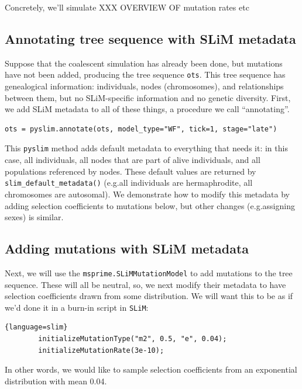 \documentclass[12pt]{article}
\newcommand{\slim}[0]{\texttt{SLiM}\xspace}
\newcommand{\pyslim}[0]{\texttt{pyslim}\xspace}
\newcommand*{\eg}{e.g.\xcomma}
\begin{document}
Concretely, we'll simulate XXX OVERVIEW OF mutation rates etc


\subsection*{Annotating tree sequence with SLiM metadata}

Suppose that the coalescent simulation has already been done,
but mutations have not been added,
producing the tree sequence \verb|ots|.
This tree sequence has genealogical information:
individuals, nodes (chromosomes), and relationships between them,
but no SLiM-specific information and no genetic diversity.
First, we add SLiM metadata to all of these things, a procedure we call ``annotating''.
\begin{listing}[H]
  \begin{verbatim}
ots = pyslim.annotate(ots, model_type="WF", tick=1, stage="late")
  \end{verbatim}
\end{listing}
This \pyslim method adds default metadata to everything that needs it:
in this case, all individuals, all nodes that are part of alive individuals,
and all populations referenced by nodes.
These default values are returned by \verb|slim_default_metadata()|
(\eg all individuals are hermaphrodite, all chromosomes are autosomal).
We demonstrate how to modify this metadata by adding selection coefficients to mutations below,
but other changes (\eg assigning sexes) is similar.


\subsection*{Adding mutations with SLiM metadata}

Next, we will use the \verb|msprime.SLiMMutationModel| to add mutations to the tree sequence.
These will all be neutral,
so, we next modify their metadata to have selection coefficients drawn from some distribution.
We will want this to be as if we'd done it in a burn-in script in \slim :
\begin{lstlisting}{language=slim}
        initializeMutationType("m2", 0.5, "e", 0.04);
        initializeMutationRate(3e-10);
\end{lstlisting}
In other words, we would like to sample selection coefficients
from an exponential distribution with mean 0.04.
\end{document}
